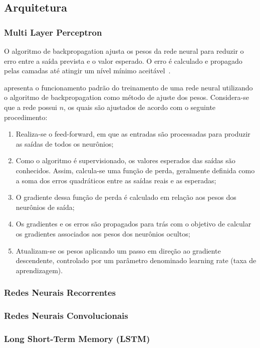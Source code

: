             
    \subsection{Arquitetura}
        \subsubsection{Multi Layer Perceptron}            
            O algoritmo de backpropagation ajusta os pesos da rede neural para reduzir o erro entre a saída prevista 
            e o valor esperado. O erro é calculado e propagado pelas camadas até atingir um nível mínimo aceitável~\cite{marangoni2010}.
            
             apresenta o funcionamento padrão do treinamento de uma rede neural utilizando o algoritmo 
            de backpropagation como método de ajuste dos pesos. Considera-se que a rede possui \( n\),  os quais são 
            ajustados de acordo com o seguinte procedimento:
            \begin{enumerate}
                \item Realiza-se o feed-forward, em que as entradas são processadas para produzir as saídas de todos os neurônios;
                \item Como o algoritmo é supervisionado, os valores esperados das saídas são conhecidos. Assim, calcula-se uma função de perda, geralmente definida como a soma dos erros quadráticos entre as saídas reais e as esperadas;
                \item O gradiente dessa função de perda é calculado em relação aos pesos dos neurônios de saída;
                \item Os gradientes e os erros são propagados para trás com o objetivo de calcular os gradientes associados aos pesos dos neurônios ocultos;
                \item Atualizam-se os pesos aplicando um passo em direção ao gradiente descendente, controlado por um parâmetro denominado learning rate (taxa de aprendizagem).
            \end{enumerate}
        \subsubsection{Redes Neurais Recorrentes}
        \subsubsection{Redes Neurais Convolucionais}
        \subsubsection{Long Short-Term Memory (LSTM)}
